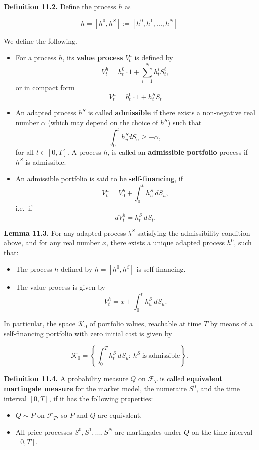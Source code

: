 \documentclass[
]{article}
\providecommand{\tightlist}{%
  \setlength{\itemsep}{0pt}\setlength{\parskip}{0pt}}
\begin{document}
\textbf{Definition 11.2.} Define the process \(h\) as

\[
h=[h^0,h^S]:=[h^0,h^1,...,h^N]
\]

We define the following.

\begin{itemize}
\tightlist
\item
  For a process \(h\), its \textbf{value process} \(V_t^h\) is defined
  by \[
    V_t^h=h^0_t\cdot 1+\sum_{i=1}^Nh_t^iS_t^i,
    \] or in compact form \[
    V_t^h=h_t^0\cdot 1 + h_t^S S_t
    \]
\item
  An adapted process \(h^S\) is called \textbf{admissible} if there
  exists a non-negative real number \(\alpha\) (which may depend on the
  choice of \(h^S\)) such that \[
    \int_0^th_u^SdS_u\ge -\alpha,
    \] for all \(t\in[0,T]\). A process \(h\), is called an
  \textbf{admissible portfolio} process if \(h^S\) is admissible.
\item
  An admissible portfolio is said to be \textbf{self-financing}, if \[
    V_t^h=V_0^h+\int_0^th_u^S\ dS_u,
    \] i.e.~if \[
    dV_t^h=h_t^S\ dS_t.
    \]
\end{itemize}

\textbf{Lemma 11.3.} For any adapted process \(h^S\) satisfying the
admissibility condition above, and for any real number \(x\), there
exists a unique adapted process \(h^0\), such that:

\begin{itemize}
\tightlist
\item
  The process \(h\) defined by \(h=[h^0,h^S]\) is self-financing.
\item
  The value process is given by \[
    V_t^h=x+\int_0^th_u^S\ dS_u.
    \]
\end{itemize}

In particular, the space \(\mathcal{K}_0\) of portfolio values,
reachable at time \(T\) by means of a self-financing portfolio with zero
initial cost is given by

\[
\mathcal{K}_0=\left\{\int_0^Th_t^S\ dS_u :\ h^S\ \text{is}\ \text{admissible}\right\}.
\]

\textbf{Definition 11.4.} A probability measure \(Q\) on
\(\mathcal{F}_T\) is called \textbf{equivalent martingale measure} for
the market model, the numeraire \(S^0\), and the time interval
\([0,T]\), if it has the following properties:

\begin{itemize}
\tightlist
\item
  \(Q\sim P\) on \(\mathcal{F}_T\), so \(P\) and \(Q\) are equivalent.
\item
  All price processes \(S^0,S^1,...,S^N\) are martingales under \(Q\) on
  the time interval \([0,T]\).
\end{itemize}
\end{document}
